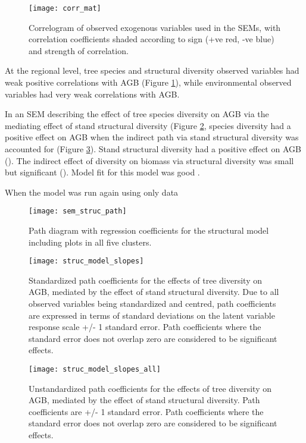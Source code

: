 \documentclass[11pt,a4paper]{article}
\begin{document}
\begin{figure}[H]
\centering
	\texttt{[image: corr\_mat]}
	\caption{Correlogram of observed exogenous variables used in the SEMs, with correlation coefficients shaded according to sign (+ve red, -ve blue) and strength of correlation.}
	\label{corr_mat}
\end{figure}

At the regional level, tree species and structural diversity observed variables had weak positive correlations with AGB (Figure \ref{corr_mat}), while environmental observed variables had very weak correlations with AGB.

In an SEM describing the effect of tree species diversity on AGB via the mediating effect of stand structural diversity (Figure \ref{sem_struc_path}, species diversity had a positive effect on AGB when the indirect path via stand structural diversity was accounted for (Figure \ref{struc_model_slopes}). Stand structural diversity had a positive effect on AGB (). The indirect effect of diversity on biomass via structural diversity was small but significant (). Model fit for this model was good .

When the model was run again using only data

\begin{figure}[H]
\centering
	\texttt{[image: sem\_struc\_path]}
	\caption{Path diagram with regression coefficients for the structural model including plots in all five clusters.}
	\label{sem_struc_path}
\end{figure}

\begin{figure}[H]
\centering
	\texttt{[image: struc\_model\_slopes]}
	\caption{Standardized path coefficients for the effects of tree diversity on AGB, mediated by the effect of stand structural diversity. Due to all observed variables being standardized and centred, path coefficients are expressed in terms of standard deviations on the latent variable response scale +/- 1 standard error. Path coefficients where the standard error does not overlap zero are considered to be significant effects.}
	\label{struc_model_slopes}
\end{figure}

\begin{figure}[H]
\centering
	\texttt{[image: struc\_model\_slopes\_all]}
	\caption{Unstandardized path coefficients for the effects of tree diversity on AGB, mediated by the effect of stand structural diversity. Path coefficients are +/- 1 standard error. Path coefficients where the standard error does not overlap zero are considered to be significant effects.}
	\label{struc_model_slopes_all}
\end{figure}
\end{document}
